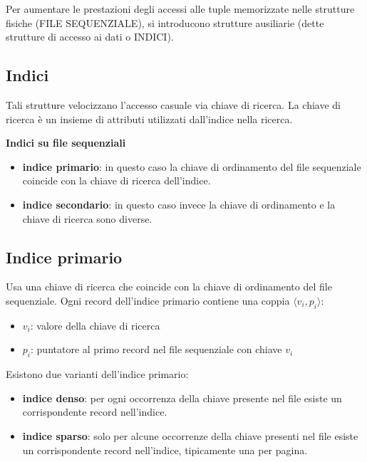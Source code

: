 \documentclass[a4paper, 10pt]{article}
\theoremstyle{definition}
\begin{document}
		Per aumentare le prestazioni degli accessi alle tuple memorizzate nelle
		strutture fisiche (FILE SEQUENZIALE), si introducono strutture
		ausiliarie (dette strutture di accesso ai dati o INDICI).
		
		\subsection*{Indici}
		
		Tali strutture velocizzano l'accesso casuale via chiave di ricerca. La chiave
		di ricerca è un insieme di attributi utilizzati dall'indice nella ricerca.
		
		\textbf{Indici su file sequenziali}
		\begin{itemize}
			\item \textbf{indice primario}: in questo caso la chiave di ordinamento del
			file sequenziale coincide con la chiave di ricerca dell'indice.
			\item \textbf{indice secondario}: in questo caso invece la chiave di
			ordinamento e la chiave di ricerca sono diverse.
		\end{itemize}
		
		\subsection*{Indice primario}
		Usa una chiave di ricerca che coincide con la chiave di ordinamento del
		file sequenziale.
		Ogni record dell'indice primario contiene una coppia $\langle v_i , p_i \rangle$:
		\begin{itemize}
			\item $v_i$: valore della chiave di ricerca
			\item $p_i$: puntatore al primo record nel file sequenziale con chiave $v_i$
		\end{itemize}
		Esistono due varianti dell'indice primario:
		\begin{itemize}
			\item \textbf{indice denso}: per ogni occorrenza della chiave presente nel file
			esiste un corrispondente record nell'indice.
			\item \textbf{indice sparso}: solo per alcune occorrenze della chiave presenti nel
			file esiste un corrispondente record nell'indice, tipicamente una per
			pagina.
		\end{itemize}
		
\end{document}
